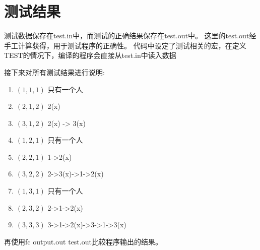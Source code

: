 \section{测试结果}

   测试数据保存在test.in中，而测试的正确结果保存在test.out中。
   这里的test.out经手工计算获得，用于测试程序的正确性。
   代码中设定了测试相关的宏，在定义TEST的情况下，编译的程序会直接从test.in中读入数据


   接下来对所有测试结果进行说明:
   \begin{enumerate}
      \item $(1,1,1)$  只有一个人
      \item $(2,1,2)$  2(x)
      \item $(3,1,2)$  2(x) -> 3(x)
      \item $(1,2,1)$  只有一个人
      \item $(2,2,1)$  1->2(x)
      \item $(3,2,2)$  2->3(x)->1->2(x)
      \item $(1,3,1)$  只有一个人
      \item $(2,3,2)$  2->1->2(x)
      \item $(3,3,3)$  3->1->2(x)->3->1->3(x)
   \end{enumerate}

   再使用fc output.out test.out比较程序输出的结果。


